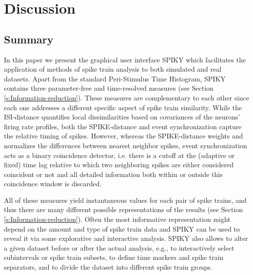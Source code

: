 \documentclass[10pt,twocolumn]{elsart5p}
\begin{document}
%




%
%
\section{\label{s:Discussion} Discussion}

\subsection{\label{ss:Summary} Summary}

In this paper we present the graphical user interface SPIKY which facilitates the application of methods of spike train analysis to both simulated and real datasets. Apart from the standard Peri-Stimulus Time Histogram, SPIKY contains three parameter-free and time-resolved measures (see Section \ref{s:Information-reduction}). These measures are complementary to each other since each one addresses a different specific aspect of spike train similarity. While the ISI-distance quantifies local dissimilarities based on covariances of the neurons’ firing rate profiles, both the SPIKE-distance and event synchronization capture the relative timing of spikes. However, whereas the SPIKE-distance weights and normalizes the differences between nearest neighbor spikes, event synchronization acts as a binary coincidence detector, i.e. there is a cutoff at the (adaptive or fixed) time lag relative to which two neighboring spikes are either considered coincident or not and all detailed information both within or outside this coincidence window is discarded.

All of these measures yield instantaneous values for each pair of spike trains, and thus there are many different possible representations of the results (see Section \ref{s:Information-reduction}). Often the most informative representation might depend on the amount and type of spike train data and SPIKY can be used to reveal it via some explorative and interactive analysis. SPIKY also allows to alter a given dataset before or after the actual analysis, e.g., to interactively select subintervals or spike train subsets, to define time markers and spike train separators, and to divide the dataset into different spike train groups. 
\end{document}
